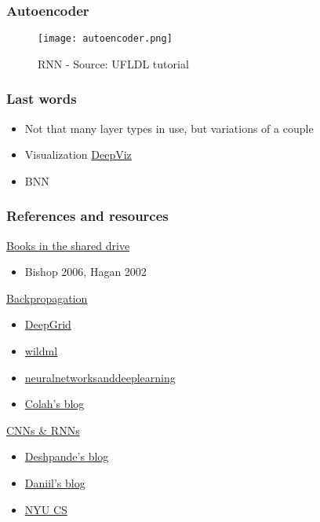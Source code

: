 \documentclass{beamer}
\begin{document}
\begin{frame}
	\frametitle{Autoencoder}
    \begin{figure}
		\texttt{[image: autoencoder.png]}
		\caption{RNN - Source: UFLDL tutorial}
	\end{figure}
\end{frame}

\begin{frame}
	\frametitle{Last words}
    \begin{itemize}
    \item Not that many layer types in use, but variations of a couple
    \item Visualization
    \color{blue}\href{https://www.youtube.com/watch?v=AgkfIQ4IGaM}{DeepViz}
    \color{black}
    \item BNN
    \end{itemize}
\end{frame}

\begin{frame}
	\frametitle{References and resources}
    \underline{Books in the shared drive}
    \begin{itemize}
    \item Bishop 2006, Hagan 2002
    \end{itemize}
    \underline{Backpropagation}
	\begin{itemize}
    \item\href{http://jefkine.com/general/2016/09/05/backpropagation-in-convolutional-neural-networks/}{DeepGrid}
    \item \href{http://www.wildml.com/2015/10/recurrent-neural-networks-tutorial-part-3-backpropagation-through-time-and-vanishing-gradients/}{wildml}
    \item \href{http://neuralnetworksanddeeplearning.com/chap2.html}{neuralnetworksanddeeplearning}
    \item \href{http://colah.github.io/posts/2015-08-Backprop/}{Colah's blog}
    \end{itemize}
    \underline{CNNs \& RNNs}
    \begin{itemize}
    \item \href{https://adeshpande3.github.io/adeshpande3.github.io/A-Beginner's-Guide-To-Understanding-Convolutional-Neural-Networks/}{Deshpande's blog} 
    \item \href{http://warmspringwinds.github.io/}{Daniil's blog}
    \item \href{http://cs.nyu.edu/~fergus/drafts/utexas2.pdf}{NYU CS}
    \end{itemize}
\end{frame}
\end{document}
